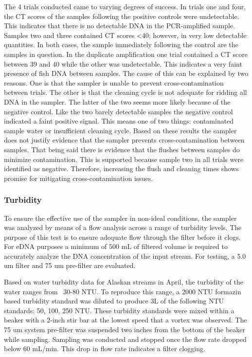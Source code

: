 \documentclass[11pt, letterpaper]{article}
\begin{document}
The 4 trials conducted came to varying degrees of success. In trials one and four, the CT scores of the samples following the positive controls were undetectable. This indicates that there is no detectable DNA in the PCR-amplified sample. Samples two and three contained CT scores <40; however, in very low detectable quantities. In both cases, the sample immediately following the control are the samples in question. In the duplicate amplification one trial contained a CT score between 39 and 40 while the other was undetectable. This indicates a very faint presence of fish DNA between samples. The cause of this can be explained by two reasons. One is that the sampler is unable to prevent cross-contamination between trials. The other is that the cleaning cycle is not adequate for ridding all DNA in the sampler. The latter of the two seems more likely because of the negative control. Like the two barely detectable samples the negative control indicated a faint positive signal. This means one of two things: contaminated sample water or insufficient cleaning cycle. Based on these results the sampler does not justify evidence that the sampler prevents cross-contamination between samples. That being said there is evidence that the flushes between samples do minimize contamination. This is supported because sample two in all trials were identified as negative. Therefore, increasing the flush and cleaning times shows promise for mitigating cross-contamination issues.

\subsubsection{Turbidity}
To ensure the effective use of the sampler in non-ideal conditions, the sampler was analyzed by means of a flow analysis across a range of turbidity levels. The purpose of this test is to ensure adequate flow through the filter before it clogs. For eDNA purposes a minimum of 500 mL of filtered volume is required to accurately analyze the DNA concentration of the input stream. For testing, a 5.0 um filter and 75 um pre-filter are evaluated.
\newline\par
Based on water turbidity data for Alaskan streams in April, the turbidity of the water ranges from ~30-80 NTU. To reproduce this range, a 2000 NTU formazin based turbidity standard was diluted to produce 3L of the following NTU standards: 50, 100, 250 NTU. These turbidity standards were mixed within a beaker with a 2-inch stir bar at the lowest speed that a vortex was observed. The 75 um system pre-filter was suspended two inches from the bottom of the beaker while sampling. Sampling was conducted and stopped once the flow rate dropped below 60 mL/min. This drop in flow rate indicates a filter clogging.
\end{document}
